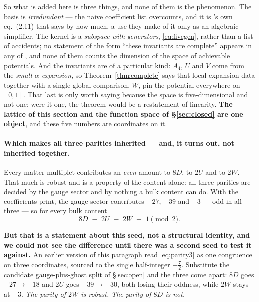 \documentclass[11pt,a4paper]{article}
\begin{document}
\noindent So what is added here is three things, and none of them is the phenomenon. The basis is
\emph{irredundant} --- the naive coefficient list overcounts, and it is \cite{CCD24}'s own
eq.~(2.11) that says by how much, a use they make of it only as an algebraic simplifier. The kernel
is a \emph{subspace with generators}, \eqref{eq:fivegen}, rather than a list of accidents; no
statement of the form ``these invariants are complete'' appears in any of \cite{HY04,HHK03,CCD24},
and none of them counts the dimension of the space of achievable potentials. And the invariants are
of a particular kind: $A_4$, $U$ and $V$ come from the \emph{small-$\alpha$ expansion}, so
Theorem~\ref{thm:complete} says that local expansion data together with a single global comparison,
$W$, pin the potential everywhere on $[0,1]$. That last is only worth saying because the space is
five-dimensional and not one: were it one, the theorem would be a restatement of linearity.
\textbf{The lattice of this section and the function space of \S\ref{sec:closed} are one object},
and these five numbers are coordinates on it.

\paragraph{Which makes all three parities inherited --- and, it turns out, not inherited together.}
Every matter multiplet contributes an \emph{even} amount to $8D$, to $2U$ and to $2W$. That much is
robust and is a property of the content alone: all three parities are decided by the gauge sector
and by nothing a bulk content can do. With the coefficients \cite{KM25} print, the gauge sector
contributes $-27$, $-39$ and $-3$ --- odd in all three --- so for every bulk content
\begin{equation}\label{eq:parity3}
  8D\;\equiv\;2U\;\equiv\;2W\;\equiv\;1\pmod 2 .
\end{equation}

\noindent \textbf{But that is a statement about this seed, not a structural identity, and we could
not see the difference until there was a second seed to test it against.} An earlier version of
this paragraph read \eqref{eq:parity3} as one congruence on three coordinates, sourced to the
single half-integer $-\tfrac72$. Substitute the candidate gauge-plus-ghost split of
\S\ref{sec:open} and the three come apart: $8D$ goes $-27\to-18$ and $2U$ goes $-39\to-30$, both
losing their oddness, while $2W$ stays at $-3$. \emph{The parity of $2W$ is robust. The parity of
$8D$ is not.}
\end{document}
